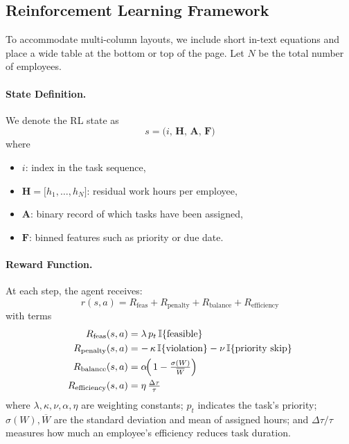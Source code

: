 \documentclass[%
aip,
cp,  %
amsmath,amssymb,
reprint,%
]{revtex4-2}
\begin{document}
	\subsection{\label{subsec:rl-framework}Reinforcement Learning Framework}
	
	To accommodate multi-column layouts, we include short in-text equations and place a wide table at the bottom or top of the page. Let $N$ be the total number of employees.
	
	\paragraph{State Definition.}
	We denote the RL state as 
	\begin{equation}
		s = \bigl(i,\,\mathbf{H},\,\mathbf{A},\,\mathbf{F}\bigr)
	\end{equation}
	where 
	\begin{itemize}
		\item $i$: index in the task sequence, 
		\item $\mathbf{H} = \bigl[h_{1}, \dots, h_{N}\bigr]$: residual work hours per employee, 
		\item $\mathbf{A}$: binary record of which tasks have been assigned, 
		\item $\mathbf{F}$: binned features such as priority or due date.
	\end{itemize}
	
	\paragraph{Reward Function.}
	At each step, the agent receives:
	\begin{equation}
		r(s,a) = R_{\text{feas}} + R_{\text{penalty}} + R_{\text{balance}} + R_{\text{efficiency}}
	\end{equation}
	with terms
	\begin{align}
		R_{\text{feas}}(s,a) &= \lambda\,p_{t}\,\mathbb{I}\{\text{feasible}\} \\
		R_{\text{penalty}}(s,a) &= -\,\kappa\,\mathbb{I}\{\text{violation}\}-\nu\,\mathbb{I}\{\text{priority skip}\} \\
		R_{\text{balance}}(s,a) &= \alpha\!\Bigl(\,1-\tfrac{\sigma(W)}{\overline{W}}\Bigr) \\
		R_{\text{efficiency}}(s,a) &= \eta\,\tfrac{\Delta\tau}{\tau}
	\end{align}
	where $\lambda,\kappa,\nu,\alpha,\eta$ are weighting constants; $p_{t}$ indicates the task's priority; $\sigma(W),\overline{W}$ are the standard deviation and mean of assigned hours; and $\Delta\tau/\tau$ measures how much an employee's efficiency reduces task duration.
	
\end{document}
